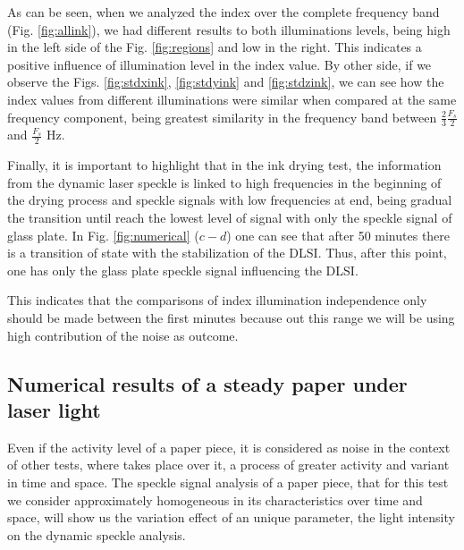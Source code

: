 \documentclass[review]{elsarticle}
\begin{document}
As can be seen, when we analyzed the index over the complete frequency band (Fig. \ref{fig:allink}),
we had different results to both illuminations levels, being high in the left side of the Fig. \ref{fig:regions} and low in the right. This 
indicates a positive influence of illumination level in the index value.
By other side, if we observe the Figs. \ref{fig:stdxink}, \ref{fig:stdyink} and \ref{fig:stdzink},
we can see how the index values from different illuminations were similar when compared at the same frequency component,
being greatest similarity in the frequency band between $\frac{2}{3}\frac{F_s}{2}$ and $\frac{F_s}{2}$ Hz.

Finally, it is important to highlight that in the ink drying test, the information from the dynamic laser speckle is linked to high frequencies in the beginning of the drying process and  speckle signals with low frequencies at end, being gradual the transition
until reach the lowest level of signal with only the speckle signal of glass plate.
In Fig. \ref{fig:numerical} ($c-d$) one can see that after 50 minutes there is a transition of state with the stabilization of the DLSI. Thus, after this point, one has only the glass plate speckle signal influencing the DLSI.

This indicates that the comparisons of index illumination independence
only should be made between the first minutes because out this range we will be using high contribution of 
the noise as outcome.

\subsection{Numerical results of a steady paper under laser light} 
\label{subsec:numericalpaper}


Even if the activity level of a paper piece, 
it  is considered as noise in the context of other tests, where takes place over it, 
a process of greater activity and variant in time and space. 
The speckle signal analysis of a paper piece, 
that for this test we consider approximately homogeneous in its characteristics over time and space,
will show us  the variation effect of an unique parameter, the light intensity on the dynamic speckle analysis.
\end{document}
